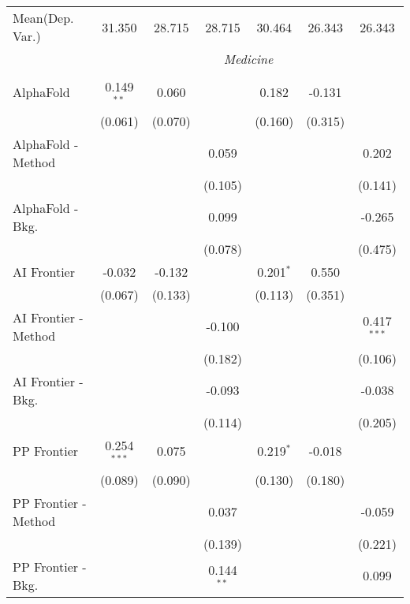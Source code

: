 \begin{tabular}{lcccccc}
Mean(Dep. Var.) & 31.350 & 28.715 & 28.715 & 30.464 & 26.343 & 26.343 \\
 & \multicolumn{6}{c}{\textit{Medicine}} \\ \\
   AlphaFold            & 0.149$^{**}$  & 0.060   &              & 0.182       & -0.131  &   \\   
                        & (0.061)       & (0.070) &              & (0.160)     & (0.315) &   \\   
   AlphaFold - Method   &               &         & 0.059        &             &         & 0.202\\   
                        &               &         & (0.105)      &             &         & (0.141)\\   
   AlphaFold - Bkg.     &               &         & 0.099        &             &         & -0.265\\   
                        &               &         & (0.078)      &             &         & (0.475)\\   
   AI Frontier          & -0.032        & -0.132  &              & 0.201$^{*}$ & 0.550   &   \\   
                        & (0.067)       & (0.133) &              & (0.113)     & (0.351) &   \\   
   AI Frontier - Method &               &         & -0.100       &             &         & 0.417$^{***}$\\   
                        &               &         & (0.182)      &             &         & (0.106)\\   
   AI Frontier - Bkg.   &               &         & -0.093       &             &         & -0.038\\   
                        &               &         & (0.114)      &             &         & (0.205)\\   
   PP Frontier          & 0.254$^{***}$ & 0.075   &              & 0.219$^{*}$ & -0.018  &   \\   
                        & (0.089)       & (0.090) &              & (0.130)     & (0.180) &   \\   
   PP Frontier - Method &               &         & 0.037        &             &         & -0.059\\   
                        &               &         & (0.139)      &             &         & (0.221)\\   
   PP Frontier - Bkg.   &               &         & 0.144$^{**}$ &             &         & 0.099\\   

\end{tabular}
